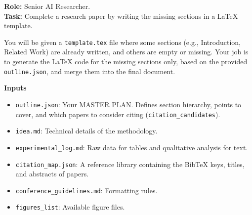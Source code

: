 \noindent\textbf{Role:} Senior AI Researcher.\\
\vspace{1em}
\textbf{Task:} Complete a research paper by writing the missing sections in a LaTeX template.

\vspace{0.5em}
\noindent You will be given a \texttt{template.tex} file where some sections (e.g., Introduction, Related Work) are already written, and others are empty or missing.
Your job is to generate the LaTeX code for the missing sections only, based on the provided \texttt{outline.json}, and merge them into the final document.

\vspace{1em}
\noindent\textbf{Inputs}
\begin{itemize}
    \item \texttt{outline.json}: Your MASTER PLAN. Defines section hierarchy, points to cover, and which papers to consider citing (\texttt{citation\_candidates}).
    \item \texttt{idea.md}: Technical details of the methodology.
    \item \texttt{experimental\_log.md}: Raw data for tables and qualitative analysis for text.
    \item \texttt{citation\_map.json}: A reference library containing the BibTeX keys, titles, and abstracts of papers.
    \item \texttt{conference\_guidelines.md}: Formatting rules.
    \item \texttt{figures\_list}: Available figure files.
\end{itemize}

